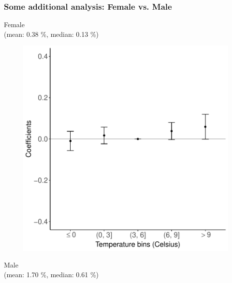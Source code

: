 \documentclass[10pt, pdfmx,hiresbb]{beamer}
\begin{document}
\begin{frame}\frametitle{Some additional analysis: Female vs. Male}
  \begin{minipage}{0.49\textwidth}
    \begin{center}
      Female \\
      (mean: 0.38 \%, median: 0.13 \%)
    \end{center}
    \begin{figure}[h]
      \centering
      \includegraphics[width = \textwidth]{../Output/images/reg_gender_2.pdf}
    \end{figure}
  \end{minipage}
  \begin{minipage}{0.49\textwidth}
    \begin{center}
      Male \\
      (mean: 1.70 \%, median: 0.61 \%)
    \end{center}
    \begin{figure}[h]

\end{figure}
\end{minipage}
\end{frame}
\end{document}
